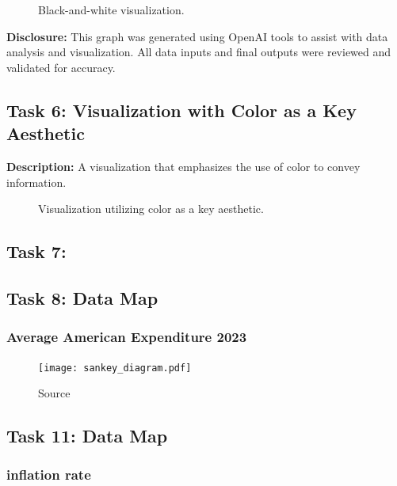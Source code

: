 \documentclass[a4paper,landscape]{article}
\begin{document}
\begin{figure}[H]
    \centering
    \caption{Black-and-white visualization.}
    \label{fig:bw}
\end{figure}

\textbf{Disclosure:} This graph was generated using OpenAI tools to assist with data analysis and visualization. All data inputs and final outputs were reviewed and validated for accuracy.

\subsection{Task 6: Visualization with Color as a Key Aesthetic}
\textbf{Description:} A visualization that emphasizes the use of color to convey information.

\begin{figure}[H]
    \centering
    \caption{Visualization utilizing color as a key aesthetic.}
    \label{fig:color}
\end{figure}

\subsection{Task 7:}


\subsection{Task 8: Data Map}
\subsubsection{Average American Expenditure 2023}
\begin{figure}[H]
    \centering
    \caption{Source \cite{bls2025expenditure}}
    \texttt{[image: sankey\_diagram.pdf]} %
    \label{fig:americanExp}
\end{figure}

\subsection{Task 11: Data Map}
\subsubsection{inflation rate}

\begin{figure}[H]
    \centering
    \caption{}
    \label{fig:inflation}
\end{figure}
\end{document}
